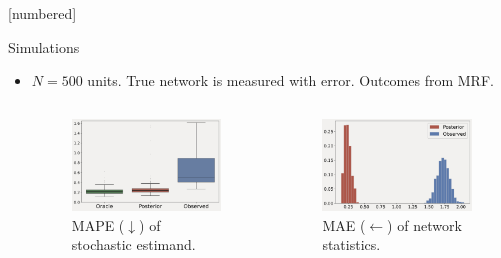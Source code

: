 \documentclass{beamer}
\begin{document}
    [numbered]
    \begin{frame}[t]{Simulations}
        \begin{itemize}
            \item $N=500$ units. True network is measured with error. Outcomes from MRF.
            \pause
            \vspace{0.5cm}
            \begin{columns}
            \begin{figure}[hbtp]
                \centering
                \includegraphics[width=1\textwidth]{figs/mape_boxplot.png}
                \footnotesize
                \caption{MAPE ($\downarrow$) of stochastic estimand.}
            \end{figure}
            \pause
                \begin{figure}[hbtp]
                    \centering
                    \includegraphics[width=1\textwidth]{figs/mae_hist.png}
                    \footnotesize
                    \caption{MAE ($\leftarrow$) of network statistics.}
                \end{figure}
        \end{columns}
        \end{itemize}        
    \end{frame}
\end{document}
